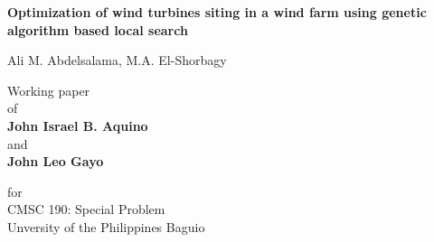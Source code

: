 \begin{titlepage}
    \begin{center}
        \vspace*{1cm}
 
        \Huge
        \textbf{Optimization of wind turbines siting in a wind farm using genetic algorithm based local search}
 
        \vspace{0.5cm}
        \LARGE
        Ali M. Abdelsalama, M.A. El-Shorbagy
 
        \vfill
        
        \large
 
        Working paper \\
        of \\
        \vspace{0.5cm}
        \textbf{John Israel B. Aquino} \\ and \\
        \textbf{John Leo Gayo} 
        
        \vspace{0.5cm}
        for \\
        CMSC 190: Special Problem \\
        Unversity of the Philippines Baguio
 
 
    \end{center}
\end{titlepage}